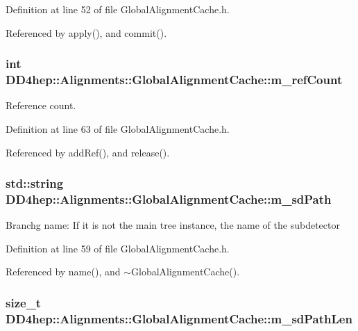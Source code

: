 Definition at line 52 of file GlobalAlignmentCache.h.

Referenced by apply(), and commit().\hypertarget{class_d_d4hep_1_1_alignments_1_1_global_alignment_cache_ac6889cb128e532b71a56ce2a2fdd305f}{
\subsubsection[{m\_\-refCount}]{\setlength{\rightskip}{0pt plus 5cm}int {\bf DD4hep::Alignments::GlobalAlignmentCache::m\_\-refCount}}}
\label{class_d_d4hep_1_1_alignments_1_1_global_alignment_cache_ac6889cb128e532b71a56ce2a2fdd305f}


Reference count. 

Definition at line 63 of file GlobalAlignmentCache.h.

Referenced by addRef(), and release().\hypertarget{class_d_d4hep_1_1_alignments_1_1_global_alignment_cache_a24050f584cfe000084802279065b8ee9}{
\subsubsection[{m\_\-sdPath}]{\setlength{\rightskip}{0pt plus 5cm}std::string {\bf DD4hep::Alignments::GlobalAlignmentCache::m\_\-sdPath}}}
\label{class_d_d4hep_1_1_alignments_1_1_global_alignment_cache_a24050f584cfe000084802279065b8ee9}
Branchg name: If it is not the main tree instance, the name of the subdetector 

Definition at line 59 of file GlobalAlignmentCache.h.

Referenced by name(), and $\sim$GlobalAlignmentCache().\hypertarget{class_d_d4hep_1_1_alignments_1_1_global_alignment_cache_a8adea69d0bd2c58caa97638937cafabf}{
\subsubsection[{m\_\-sdPathLen}]{\setlength{\rightskip}{0pt plus 5cm}size\_\-t {\bf DD4hep::Alignments::GlobalAlignmentCache::m\_\-sdPathLen}}}
\label{class_d_d4hep_1_1_alignments_1_1_global_alignment_cache_a8adea69d0bd2c58caa97638937cafabf}


